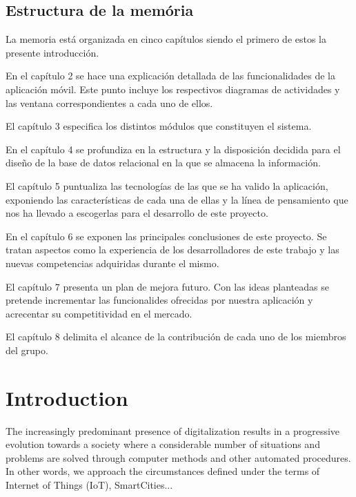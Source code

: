 \documentclass[11pt,spanish,
		listoftables,listoffigures]
		{tfgplantilla}
\begin{document}
\section{Estructura de la mem\'oria}

La memoria está organizada en cinco capítulos siendo el primero de estos la presente introducción.

En el capítulo 2 se hace una explicación detallada de las funcionalidades de la aplicación móvil. Este punto incluye los respectivos diagramas de actividades y las ventana correspondientes a cada uno de ellos.

El capítulo 3 especifica los distintos módulos que constituyen el sistema. 

En el capítulo 4 se profundiza en la estructura y la disposición decidida para el diseño de la base de datos relacional en la que se almacena la información.

El capítulo 5 puntualiza las tecnologías de las que se ha valido la aplicación, exponiendo las características de cada una de ellas y la línea de pensamiento que nos ha llevado a escogerlas para el desarrollo de este proyecto.

En el capítulo 6 se exponen las principales conclusiones de este proyecto. Se tratan aspectos como la experiencia de los desarrolladores de este trabajo y las nuevas competencias adquiridas durante el mismo.

El capítulo 7 presenta un plan de mejora futuro. Con las ideas planteadas se pretende incrementar las funcionalides ofrecidas por nuestra aplicación y acrecentar su competitividad en el mercado.

El capítulo 8 delimita el alcance de la contribución de cada uno de los miembros del grupo.


\addtocounter{chapter}{-1}
\chapter{Introduction}

The increasingly predominant presence of digitalization results in a progressive evolution towards a society where a considerable number of situations and problems are solved through computer methods and other automated procedures. In other words, we approach the circumstances defined under the terms of Internet of Things (IoT), SmartCities...
\end{document}
